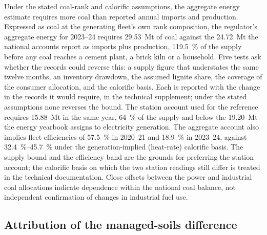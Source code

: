 \documentclass[essd,manuscript]{copernicus}
\begin{document}
Under the stated coal-rank and calorific assumptions, the aggregate energy estimate requires more coal than reported annual imports and production. Expressed as coal at the generating fleet's own rank composition, the regulator's aggregate energy for 2023--24 requires \SI{29.53}{\mega\tonne} of coal against the \SI{24.72}{\mega\tonne} the national accounts report as imports plus production, \SI{119.5}{\percent} of the supply before any coal reaches a cement plant, a brick kiln or a household. Five tests ask whether the records could reverse this: a supply figure that understates the same twelve months, an inventory drawdown, the assumed lignite share, the coverage of the consumer allocation, and the calorific basis. Each is reported with the change in the records it would require, in the technical supplement; under the stated assumptions none reverses the bound. The station account used for the reference requires \SI{15.88}{\mega\tonne} in the same year, \SI{64}{\percent} of the supply and below the \SI{19.20}{\mega\tonne} the energy yearbook assigns to electricity generation. The aggregate account also implies fleet efficiencies of \SI{57.5}{\percent} in 2020--21 and \SI{18.9}{\percent} in 2023--24, against \SIrange{32.4}{45.7}{\percent} under the generation-implied (heat-rate) calorific basis. The supply bound and the efficiency band are the grounds for preferring the station account; the calorific basis on which the two station readings still differ is treated in the technical documentation. Close offsets between the power and industrial coal allocations indicate dependence within the national coal balance, not independent confirmation of changes in industrial fuel use.

\subsection{Attribution of the managed-soils difference}
\label{sec:soils}
\end{document}
